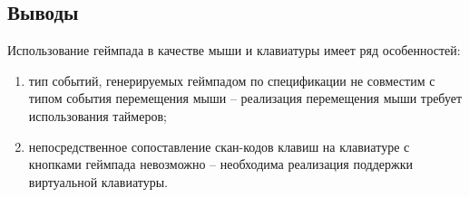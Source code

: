 \subsection*{Выводы}

Использование геймпада в качестве мыши и клавиатуры имеет ряд особенностей:

\begin{enumerate}[leftmargin=1.6\parindent]
    \item тип событий, генерируемых геймпадом по спецификации не совместим с типом события перемещения мыши -- реализация перемещения мыши требует использования таймеров;
    \item непосредственное сопоставление скан-кодов клавиш на клавиатуре с кнопками геймпада невозможно -- необходима реализация поддержки виртуальной клавиатуры.
\end{enumerate}

\pagebreak
